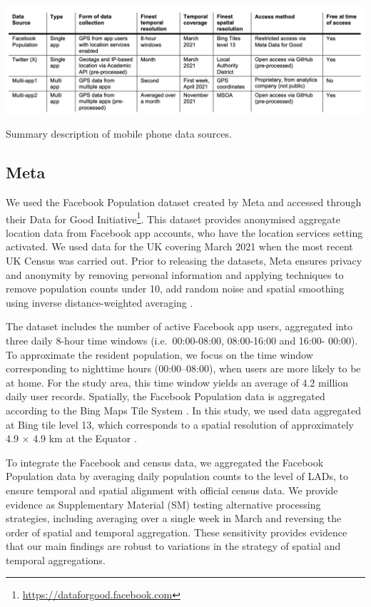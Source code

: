 \documentclass[]{rsos}%
\begin{document}
\begin{table}[h]
\centering
\includegraphics[width=1\linewidth]{figures/table-data-source.png}
\caption{Summary description of mobile phone data sources.}
\label{tab:data-source}
\end{table}

\subsection{Meta}\label{meta}

We used the Facebook Population dataset created by Meta and accessed
through their Data for Good Initiative\footnote{\url{https://dataforgood.facebook.com}}. This dataset provides
anonymised aggregate location data from Facebook app accounts, who have
the location services setting activated.
We used data for the UK covering March 2021 when the most recent UK
Census was carried out. Prior to releasing the datasets, Meta ensures
privacy and anonymity by removing personal information and applying techniques to remove population
counts under 10, add random noise and spatial smoothing using
inverse distance-weighted averaging \citep{maas2019}.

The dataset includes the number of active Facebook app users, aggregated
into three daily 8-hour time windows (i.e.~00:00-08:00, 08:00-16:00 and
16:00- 00:00). To approximate the resident population, we focus on the
time window corresponding to nighttime hours (00:00--08:00), when users
are more likely to be at home. For the study area, this time window
yields an average of 4.2 million daily user records. Spatially, the
Facebook Population data is aggregated according to the Bing Maps Tile
System \citep{bingmaps_tile_system}. In this study, we used data aggregated
at Bing tile level 13, which corresponds to a spatial resolution of
approximately 4.9 \(\times\) 4.9 km at the Equator \citep{maas2019}.

To integrate the Facebook and census data, we aggregated the Facebook
Population data by averaging daily population counts to the level of
LADs, to ensure temporal and spatial alignment with official census
data. We provide evidence as Supplementary Material (SM) testing
alternative processing strategies, including averaging over a single
week in March and reversing the order of spatial and temporal
aggregation. These sensitivity provides evidence that our main findings
are robust to variations in the strategy of spatial and temporal
aggregations.
\end{document}
